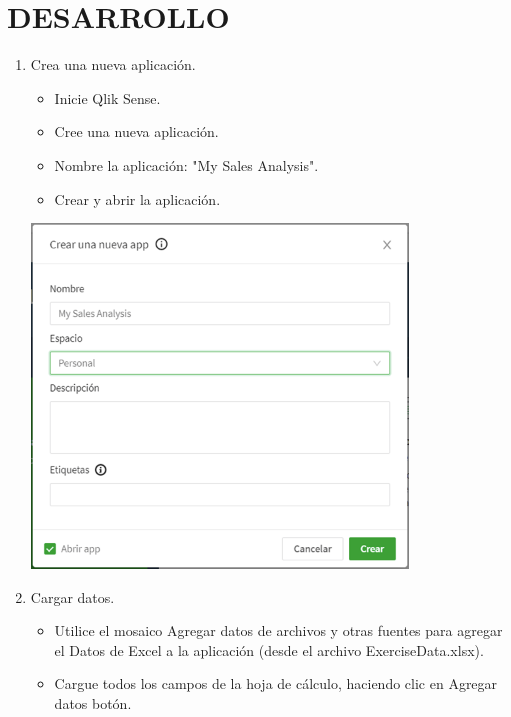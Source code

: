 \documentclass[12pt,letterpaper]{article}
\begin{document}
\section{DESARROLLO}
\begin{enumerate}
    \item Crea una nueva aplicación.
    \begin{itemize}
        \item Inicie Qlik Sense.
        \item Cree una nueva aplicación.
        \item Nombre la aplicación: "My Sales Analysis".
        \item Crear y abrir la aplicación.
    \end{itemize}
        \begin{center}
            \includegraphics[width=10cm]{./img/image1.png} 
        \end{center}
    \item Cargar datos.
    \begin{itemize}
        \item Utilice el mosaico Agregar datos de archivos y otras fuentes para agregar el Datos de Excel a la aplicación (desde el archivo ExerciseData.xlsx).
        \item Cargue todos los campos de la hoja de cálculo, haciendo clic en Agregar datos botón.
    \end{itemize}


\end{enumerate}
\end{document}
